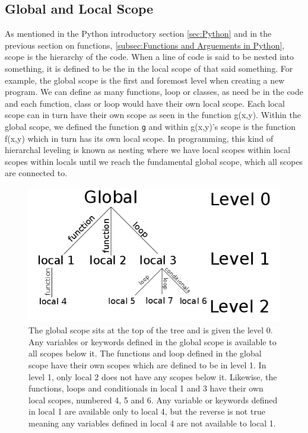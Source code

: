 \documentclass[11pt,a4paper]{book}
\begin{document}
			\subsection{Global and Local Scope}
				\label{subsec:Global and Local Scope}
				As mentioned in the Python introductory section \autoref{sec:Python} and in the previous section on functions, \autoref{subsec:Functions and Arguements in Python}, scope is the hierarchy of the code. When a line of code is said to be nested into something, it is defined to be the in the local scope of that said something. For example, the global scope is the first and foremost level when creating a new program. We can define as many functions, loop or classes, as need be in the code and each function, class or loop would have their own local scope. Each local scope can in turn have their own scope as seen in the function g(x,y). Within the global scope, we defined the function \lstinline|g| and within g(x,y)'s scope is the function f(x,y) which in turn has its own local scope. In programming, this kind of hierarchal leveling is known as nesting where we have local scopes within local scopes within locals until we reach the fundamental global scope, which all scopes are connected to. %
				
				\begin{figure} [!ht]
					\centering
					\def\svgwidth{\columnwidth}
					\includegraphics[scale=0.70]{images/chapter-8/scope_diagram}
					\caption{The global scope sits at the top of the tree and is given the level 0. Any variables or keywords defined in the global scope is available to all scopes below it. The functions and loop defined in the global scope have their own scopes which are defined to be in level 1. In level 1, only local 2 does not have any scopes below it. Likewise, the functions, loops and conditionals in local 1 and 3 have their own local scopes, numbered 4, 5 and 6. Any variable or keywords defined in local 1 are available only to local 4, but the reverse is not true meaning any variables defined in local 4 are not available to local 1. }
					\label{fig:scope_diagram}
				\end{figure}
				
\end{document}
